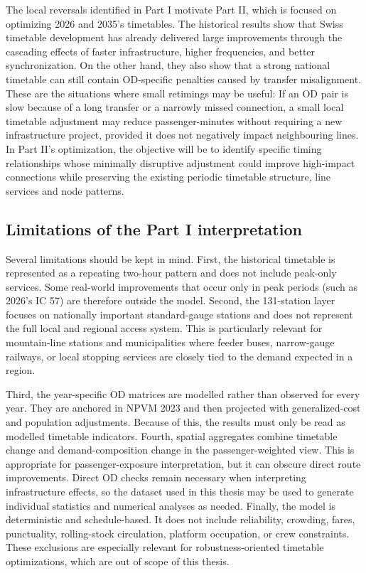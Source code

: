 \documentclass[preprint,12pt]{elsarticle}
\begin{document}
The local reversals identified in Part I motivate Part II, which is focused on optimizing 2026 and 2035's timetables. The historical results show that Swiss timetable development has already delivered large improvements through the cascading effects of faster infrastructure, higher frequencies, and better synchronization. On the other hand, they also show that a strong national timetable can still contain OD-specific penalties caused by transfer misalignment. These are the situations where small retimings may be useful: If an OD pair is slow because of a long transfer or a narrowly missed connection, a small local timetable adjustment may reduce passenger-minutes without requiring a new infrastructure project, provided it does not negatively impact neighbouring lines. In Part II's optimization, the objective will be to identify specific timing relationships whose minimally disruptive adjustment could improve high-impact connections while preserving the existing periodic timetable structure, line services and node patterns.

\subsection{Limitations of the Part I interpretation}\label{sec:discussion-part1-limitations}

Several limitations should be kept in mind. First, the historical timetable is represented as a repeating two-hour pattern and does not include peak-only services. Some real-world improvements that occur only in peak periods (such as 2026's IC 57) are therefore outside the model. Second, the 131-station layer focuses on nationally important standard-gauge stations and does not represent the full local and regional access system. This is particularly relevant for mountain-line stations and municipalities where feeder buses, narrow-gauge railways, or local stopping services are closely tied to the demand expected in a region.

Third, the year-specific OD matrices are modelled rather than observed for every year. They are anchored in NPVM 2023 and then projected with generalized-cost and population adjustments. Because of this, the results must only be read as modelled timetable indicators. Fourth, spatial aggregates combine timetable change and demand-composition change in the passenger-weighted view. This is appropriate for passenger-exposure interpretation, but it can obscure direct route improvements. Direct OD checks remain necessary when interpreting infrastructure effects, so the dataset used in this thesis may be used to generate individual statistics and numerical analyses as needed. Finally, the model is deterministic and schedule-based. It does not include reliability, crowding, fares, punctuality, rolling-stock circulation, platform occupation, or crew constraints. These exclusions are especially relevant for robustness-oriented timetable optimizations, which are out of scope of this thesis.
\end{document}
